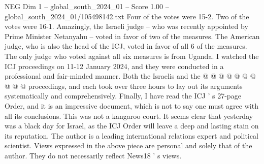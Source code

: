 \begin{textsample}{NEG Dim 1 – global\_south\_2024\_01 – Score 1.00 – global\_south\_2024\_01/105498142.txt}
Four of the votes were 15-2.
Two of the votes were 16-1.
Amazingly, the Israeli judge -- who was recently appointed by Prime Minister Netanyahu -- voted in favor of two of the measures.
The American judge, who is also the head of the ICJ, voted in favor of all 6 of the measures.
The only judge who voted against all six measures is from Uganda.
I watched the ICJ proceedings on 11-12 January 2024, and they were conducted in a professional and fair-minded manner.
Both the Israelis and the @ @ @ @ @ @ @ @ @ @ proceedings, and each took over three hours to lay out its arguments systematically and comprehensively.
Finally, I have read the ICJ ' s 27-page Order, and it is an impressive document, which is not to say one must agree with all its conclusions.
This was not a kangaroo court.
It seems clear that yesterday was a black day for Israel, as the ICJ Order will leave a deep and lasting stain on its reputation.
The author is a leading international relations expert and political scientist.
Views expressed in the above piece are personal and solely that of the author.
They do not necessarily reflect News18 ' s views.

\end{textsample}
